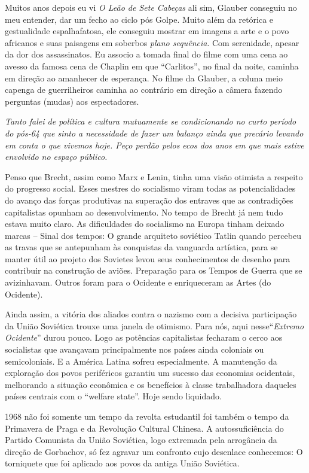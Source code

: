 Muitos anos depois eu vi {\it O Leão de Sete Cabeças} ali sim, Glauber
conseguiu no meu entender, dar um fecho ao ciclo pós Golpe. Muito além
da retórica e gestualidade espalhafatosa, ele conseguiu mostrar em
imagens a arte e o povo africanos e suas paisagens em soberbos
{\it plano sequência}. Com serenidade, apesar da dor dos assassinatos.
Eu associo a tomada final do filme com uma cena ao avesso da famosa cena
de Chaplin em que “Carlitos”, no final da noite, caminha em direção ao
amanhecer de esperança. No filme da Glauber, a coluna meio capenga de
guerrilheiros caminha ao contrário em direção a câmera fazendo perguntas
(mudas) aos espectadores.

{\it Tanto falei de política e cultura mutuamente se condicionando no
curto período do pós-64 que sinto a necessidade de fazer um balanço
ainda que precário levando em conta o que vivemos hoje. Peço perdão
pelos ecos dos anos em que mais estive envolvido no espaço público.}

Penso que Brecht, assim como Marx e Lenin, tinha uma visão otimista a
respeito do progresso social. Esses mestres do socialismo viram todas as
potencialidades do avanço das forças produtivas na superação dos
entraves que as contradições capitalistas opunham ao desenvolvimento. No
tempo de Brecht já nem tudo estava muito claro. As dificuldades do
socialismo na Europa tinham deixado marcas -- Sinal dos tempos: O grande
arquiteto soviético Tatlin quando percebeu as travas que se antepunham
às conquistas da vanguarda artística, para se manter útil ao projeto dos
Sovietes levou seus conhecimentos de desenho para contribuir na
construção de aviões. Preparação para os Tempos de Guerra que se
avizinhavam. Outros foram para o Ocidente e enriqueceram as Artes (do
Ocidente).

Ainda assim, a vitória dos aliados contra o nazismo com a decisiva
participação da União Soviética trouxe uma janela de otimismo. Para nós,
aqui nesse“{\it Extremo Ocidente}” durou pouco. Logo as potências
capitalistas fecharam o cerco aos socialistas que avançavam
principalmente nos países ainda coloniais ou semicoloniais. E a América
Latina sofreu especialmente. A manutenção da exploração dos povos
periféricos garantiu um sucesso das economias ocidentais, melhorando a
situação econômica e os benefícios à classe trabalhadora daqueles países
centrais com o “welfare state”. Hoje sendo liquidado.

1968 não foi somente um tempo da revolta estudantil foi também o tempo
da Primavera de Praga e da Revolução Cultural Chinesa. A
autossuficiência do Partido Comunista da União Soviética, logo extremada
pela arrogância da direção de Gorbachov, só fez agravar um confronto
cujo desenlace conhecemos: O torniquete que foi aplicado aos povos da
antiga União Soviética.

